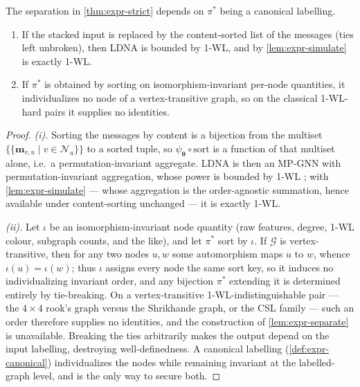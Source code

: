 \begin{proposition}
\label{prop:expr-necessity}
The separation in \cref{thm:expr-strict} depends on $\pi^*$ being a canonical
labelling.
\begin{enumerate}
  \item[(i)] If the stacked input  is replaced by the
        content-sorted list of the messages (ties left unbroken), then LDNA is
        bounded by 1-WL, and by \cref{lem:expr-simulate} is exactly 1-WL.
  \item[(ii)] If $\pi^*$ is obtained by sorting on isomorphism-invariant per-node
        quantities, it individualizes no node of a vertex-transitive graph, so on
        the classical 1-WL-hard pairs it supplies no identities.
\end{enumerate}
\end{proposition}

\begin{proof}
\emph{(i).} Sorting the messages by content is a bijection from the multiset
$\{\!\{\mathbf{m}_{v,u}\mid v\in\mathcal{N}_u\}\!\}$ to a sorted tuple, so
$\psi_{\bm{\theta}}\circ\mathrm{sort}$ is a function of that multiset alone,
i.e.\ a permutation-invariant aggregate. LDNA is then an MP-GNN with
permutation-invariant aggregation, whose power is bounded by 1-WL
\citep{Xu2019GIN,Morris2019WL}; with \cref{lem:expr-simulate} --- whose
aggregation is the order-agnostic summation, hence available under
content-sorting unchanged --- it is exactly 1-WL.

\emph{(ii).} Let $\iota$ be an isomorphism-invariant node quantity (raw features,
degree, 1-WL colour, subgraph counts, and the like), and let $\pi^*$ sort by
$\iota$. If $\mathcal{G}$ is vertex-transitive, then for any two nodes $u,w$ some
automorphism maps $u$ to $w$, whence $\iota(u)=\iota(w)$; thus $\iota$ assigns
every node the same sort key, so it induces no individualizing invariant order,
and any bijection $\pi^*$ extending it is determined entirely by tie-breaking. On a vertex-transitive 1-WL-indistinguishable pair --- the $4\times4$
rook's graph versus the Shrikhande graph, or the CSL family --- such an order
therefore supplies no identities, and the construction of
\cref{lem:expr-separate} is unavailable. Breaking the ties arbitrarily makes the
output depend on the input labelling, destroying well-definedness. A canonical
labelling (\cref{def:expr-canonical}) individualizes the nodes while remaining
invariant at the labelled-graph level, and is the only way to secure both.
\end{proof}


